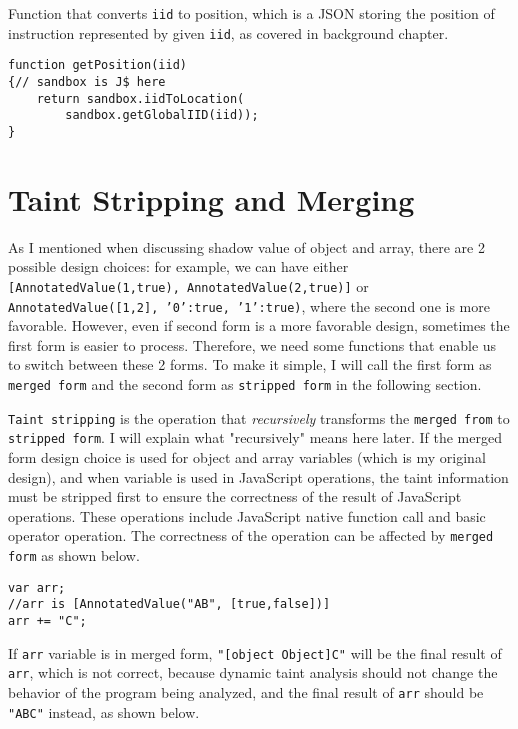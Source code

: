 Function that converts \texttt{iid} to position, which is a JSON storing the position of instruction represented by given \texttt{iid}, as covered in background chapter.

\begin{verbatim}
function getPosition(iid)
{// sandbox is J$ here
    return sandbox.iidToLocation(
        sandbox.getGlobalIID(iid));
}
\end{verbatim}

\section{Taint Stripping and Merging}

As I mentioned when discussing shadow value of object and array, there are 2 possible design choices: for example, we can have either \texttt{[AnnotatedValue(1,true), AnnotatedValue(2,true)]} or \texttt{AnnotatedValue([1,2], {'0':true, '1':true})}, where the second one is more favorable. However, even if second form is a more favorable design, sometimes the first form is easier to process. Therefore, we need some functions that enable us to switch between these 2 forms. To make it simple, I will call the first form as \texttt{merged form} and the second form as \texttt{stripped form} in the following section.

\texttt{Taint stripping} is the operation that \textit{recursively} transforms the \texttt{merged from} to \texttt{stripped form}. I will explain what "recursively" means here later. If the merged form design choice is used for object and array variables (which is my original design), and when variable is used in JavaScript operations, the taint information must be stripped first to ensure the correctness of the result of JavaScript operations. These operations include JavaScript native function call and basic operator operation. The correctness of the operation can be affected by \texttt{merged form} as shown below.

\begin{verbatim}
var arr;
//arr is [AnnotatedValue("AB", [true,false])]
arr += "C";
\end{verbatim}

If \texttt{arr} variable is in merged form, \texttt{"[object Object]C"} will be the final result of \texttt{arr}, which is not correct, because dynamic taint analysis should not change the behavior of the program being analyzed, and the final result of \texttt{arr} should be \texttt{"ABC"} instead, as shown below.

